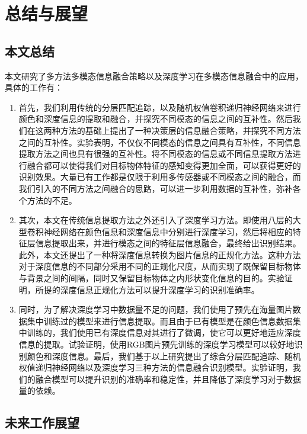 
\chapter{总结与展望}
\label{cha:conclusion}

\section{本文总结}
\label{sec:conclusion}

本文研究了多方法多模态信息融合策略以及深度学习在多模态信息融合中的应用，具体的工作有：
\begin{enumerate}
  \item 首先，我们利用传统的分层匹配追踪，以及随机权值卷积递归神经网络来进行颜色和深度信息的提取和融合，并探究不同模态的信息之间的互补性。然后我们在这两种方法的基础上提出了一种决策层的信息融合策略，并探究不同方法之间的互补性。实验表明，不仅仅不同模态的信息之间具有互补性，不同信息提取方法之间也具有很强的互补性。将不同模态的信息或不同信息提取方法进行融合都可以使得我们对目标物体特征的感知变得更加全面，可以获得更好的识别效果。大量已有工作都是仅限于利用多传感器或不同模态之间的融合，而我们引入的不同方法之间融合的思路，可以进一步利用数据的互补性，弥补各个方法的不足。
  \item 其次，本文在传统信息提取方法之外还引入了深度学习方法。即使用八层的大型卷积神经网络在颜色信息和深度信息中分别进行深度学习，然后将相应的特征层信息提取出来，并进行模态之间的特征层信息融合，最终给出识别结果。此外，本文还提出了一种将深度信息转换为图片信息的正规化方法。这种方法对于深度信息的不同部分采用不同的正规化尺度，从而实现了既保留目标物体与背景之间的间隔，同时又保留目标物体之内形状变化信息的目的。实验证明，所提的深度信息正规化方法可以提升深度学习的识别准确率。
  \item 同时，为了解决深度学习中数据量不足的问题，我们使用了预先在海量图片数据集中训练过的模型来进行信息提取。而且由于已有模型是在颜色信息数据集中训练的，我们使用已有深度信息对其进行了微调，使它可以更好地适应深度信息的提取。试验证明，使用RGB图片预先训练的深度学习模型可以较好地识别颜色和深度信息。最后，我们基于以上研究提出了综合分层匹配追踪、随机权值递归神经网络以及深度学习三种方法的信息融合识别模型。实验证明，我们的融合模型可以提升识别的准确率和稳定性，并且降低了深度学习对于数据量的依赖。
\end{enumerate}

\section{未来工作展望}
\label{sec:future}

